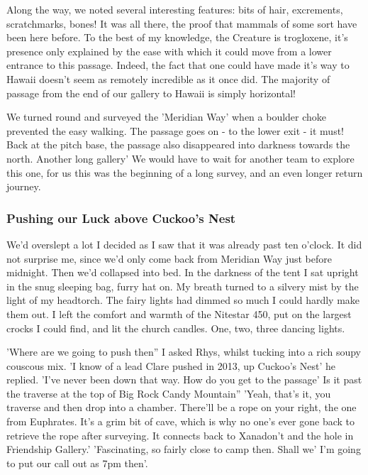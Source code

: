 \documentclass[onecolumn]{book}
\begin{document}
Along the way, we noted several interesting features: bits of hair, excrements, scratchmarks, bones! It was all there, the proof that mammals of some sort have been here before. To the best of my knowledge, the Creature is trogloxene, it's presence only explained by the ease with which it could move from a lower entrance to this passage. Indeed, the fact that one could have made it's way to Hawaii doesn't seem as remotely incredible as it once did. The majority of passage from the end of our gallery to Hawaii is simply horizontal! 

We turned round and surveyed the 'Meridian Way' when a boulder choke prevented the easy walking. The passage goes on - to the lower exit - it must! Back at the pitch base, the passage also disappeared into darkness towards the north. Another long gallery' We would have to wait for another team to explore this one, for us this was the beginning of a long survey, and an even longer return journey.


\subsubsection{Pushing our Luck above Cuckoo's Nest}

We'd overslept a lot I decided as I saw that it was already past ten o'clock. It did not surprise me, since we'd only come back from Meridian Way just before midnight. Then we'd collapsed into bed.
 In the darkness of the tent I sat upright in the snug sleeping bag, furry hat on. My breath turned to a silvery mist by the light of my headtorch. The fairy lights had dimmed so much I could hardly make them out. I left the comfort and warmth of the Nitestar 450, put on the largest crocks I could find, and lit the church candles. One, two, three dancing lights. 

'Where are we going to push then'' I asked Rhys, whilst tucking into a rich soupy couscous mix. 
'I know of a lead Clare pushed in 2013, up Cuckoo's Nest' he replied. 
'I've never been down that way. How do you get to the passage' Is it past the traverse at the top of Big Rock Candy Mountain''
'Yeah, that's it, you traverse and then drop into a chamber. There'll be a rope on your right, the one from Euphrates. It's a grim bit of cave, which is why no one's ever gone back to retrieve the rope after surveying. It connects back to Xanadon't and the hole in Friendship Gallery.'
'Fascinating, so fairly close to camp then. Shall we' I'm going to put our call out as 7pm then'. 
\end{document}

